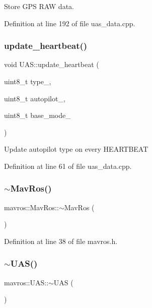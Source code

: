 Store G\+PS R\+AW data. 



Definition at line 192 of file uas\+\_\+data.\+cpp.

\mbox{\label{group__nodelib_gad353627789d9fa0e4cafb7fb8dad9b32}} 
\subsubsection{\texorpdfstring{update\_heartbeat()}{update\_heartbeat()}}
{\footnotesize\ttfamily void U\+A\+S\+::update\+\_\+heartbeat (\begin{DoxyParamCaption}\item[{uint8\+\_\+t}]{type\+\_\+,  }\item[{uint8\+\_\+t}]{autopilot\+\_\+,  }\item[{uint8\+\_\+t}]{base\+\_\+mode\+\_\+ }\end{DoxyParamCaption})}

Update autopilot type on every H\+E\+A\+R\+T\+B\+E\+AT 

Definition at line 61 of file uas\+\_\+data.\+cpp.

\mbox{\label{group__nodelib_ga34b0d289748daac51cfc675e50def27c}} 
\subsubsection{\texorpdfstring{$\sim$MavRos()}{~MavRos()}}
{\footnotesize\ttfamily mavros\+::\+Mav\+Ros\+::$\sim$\+Mav\+Ros (\begin{DoxyParamCaption}{ }\end{DoxyParamCaption})\hspace{0.3cm}{\ttfamily [inline]}}



Definition at line 38 of file mavros.\+h.

\mbox{\label{group__nodelib_gab273c619e0a6433f1ea3291103ec3710}} 
\subsubsection{\texorpdfstring{$\sim$UAS()}{~UAS()}}
{\footnotesize\ttfamily mavros\+::\+U\+A\+S\+::$\sim$\+U\+AS (\begin{DoxyParamCaption}{ }\end{DoxyParamCaption})\hspace{0.3cm}{\ttfamily [inline]}}




